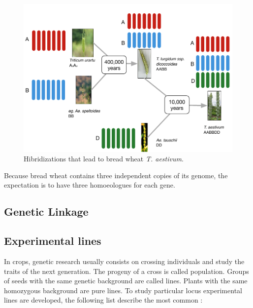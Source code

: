 \begin{figure}
  \includegraphics[width=1\textwidth]{LitReview/Figures/WheatPolyplodization.pdf}
  \caption{Hibridizations that lead to bread wheat \textit{T. aestivum}.  }
  \label{fig:lit:polyplody}
\end{figure}
Because bread wheat contains three independent copies of its genome, the expectation is to have three homoeologues for each gene. 


\subsection{Genetic Linkage}


\subsection{Experimental lines}

In crops, genetic research usually consists on crossing individuals and study the traits of the next generation. 
The progeny of a cross is called population. 
Groups of seeds with the same genetic background are called lines. 
Plants with the same homozygous background are pure lines. 
To study particular locus experimental lines are developed, the following list describe the most common \citep{VanOoijen2013Intro}:

